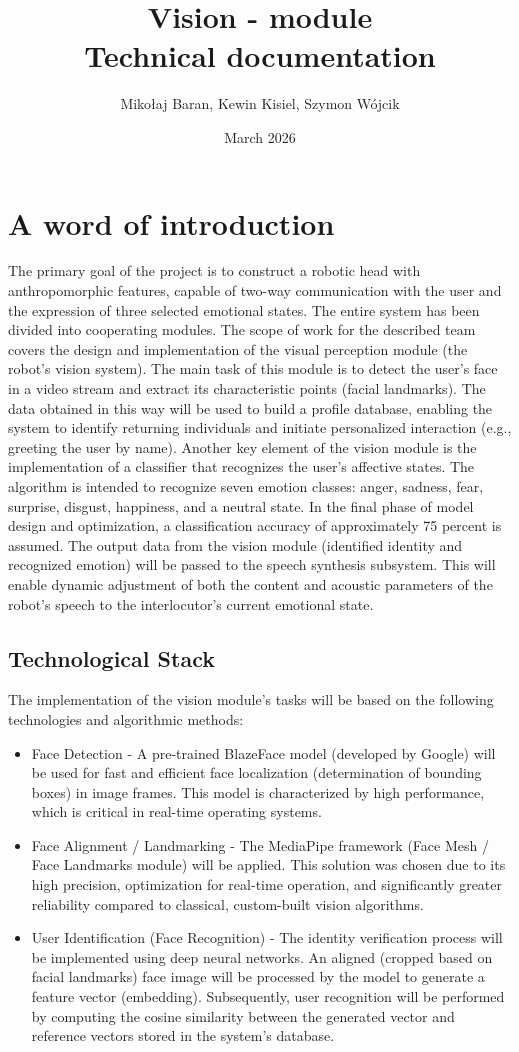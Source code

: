 \documentclass{article}
\title{Vision - module\\[1ex]
\large Technical documentation}
\author{Mikołaj Baran, Kewin Kisiel, Szymon Wójcik}
\date{March 2026}
\begin{document}
\maketitle

\tableofcontents
\newpage
\section{A word of introduction}
The primary goal of the project is to construct a robotic head with anthropomorphic features, capable of two-way communication with the user and the expression of three selected emotional states. The entire system has been divided into cooperating modules.
The scope of work for the described team covers the design and implementation of the visual perception module (the robot's vision system). The main task of this module is to detect the user's face in a video stream and extract its characteristic points (facial landmarks). The data obtained in this way will be used to build a profile database, enabling the system to identify returning individuals and initiate personalized interaction (e.g., greeting the user by name).
Another key element of the vision module is the implementation of a classifier that recognizes the user's affective states. The algorithm is intended to recognize seven emotion classes: anger, sadness, fear, surprise, disgust, happiness, and a neutral state. In the final phase of model design and optimization, a classification accuracy of approximately 75 percent is assumed.
The output data from the vision module (identified identity and recognized emotion) will be passed to the speech synthesis subsystem. This will enable dynamic adjustment of both the content and acoustic parameters of the robot's speech to the interlocutor's current emotional state.
\subsection{Technological Stack}
The implementation of the vision module's tasks will be based on the following technologies and algorithmic methods:
\begin{itemize}
\item Face Detection - A pre-trained BlazeFace \cite{blazeface} model (developed by Google) will be used for fast and efficient face localization (determination of bounding boxes) in image frames. This model is characterized by high performance, which is critical in real-time operating systems.
\item Face Alignment / Landmarking - The MediaPipe \cite{mediapipe}framework (Face Mesh / Face Landmarks module) will be applied. This solution was chosen due to its high precision, optimization for real-time operation, and significantly greater reliability compared to classical, custom-built vision algorithms.
\item User Identification (Face Recognition) - The identity verification process will be implemented using deep neural networks. An aligned (cropped based on facial landmarks) face image will be processed by the model to generate a feature vector (embedding). Subsequently, user recognition will be performed by computing the cosine similarity between the generated vector and reference vectors stored in the system's database.
\end{itemize}
\end{document}
